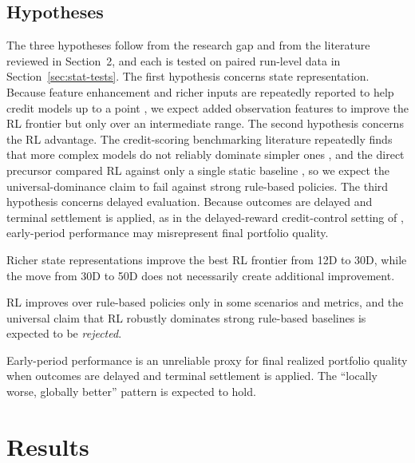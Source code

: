 \documentclass[preprint,review,authoryear,12pt]{elsarticle}
\begin{document}
\subsection{Hypotheses}
\label{sec:hypotheses}

The three hypotheses follow from the research gap and from the literature reviewed in
Section~2, and each is tested on paired run-level data in Section~\ref{sec:stat-tests}.
The first hypothesis concerns state representation. Because feature enhancement and
richer inputs are repeatedly reported to help credit models up to a point
\citep{yang2024}, we expect added observation features to improve the RL
frontier but only over an intermediate range. The second hypothesis concerns the RL
advantage. The credit-scoring benchmarking literature repeatedly finds that more complex
models do not reliably dominate simpler ones \citep{lessmann2015, gunnarsson2021}, and
the direct precursor compared RL against only a single static baseline
\citep{herasymovych2019, kiatsupaibul2024}, so we expect the universal-dominance claim to
fail against strong rule-based policies. The third hypothesis concerns delayed
evaluation. Because outcomes are delayed and terminal settlement is applied, as in the
delayed-reward credit-control setting of \citet{herasymovych2019}, early-period
performance may misrepresent final portfolio quality.

\begin{description}[leftmargin=2.2em,style=nextline]
    \item[H1 (State representation).] Richer state representations improve the best RL
          frontier from 12D to 30D, while the move from 30D to 50D does not necessarily
          create additional improvement.
    \item[H2 (RL vs.\ rule-based).] RL improves over rule-based policies only in some
          scenarios and metrics, and the universal claim that RL robustly dominates strong
          rule-based baselines is expected to be \emph{rejected}.
    \item[H3 (Delayed evaluation).] Early-period performance is an unreliable proxy for
          final realized portfolio quality when outcomes are delayed and terminal
          settlement is applied. The ``locally worse, globally better'' pattern is expected
          to hold.
\end{description}

\section{Results}
\end{document}
